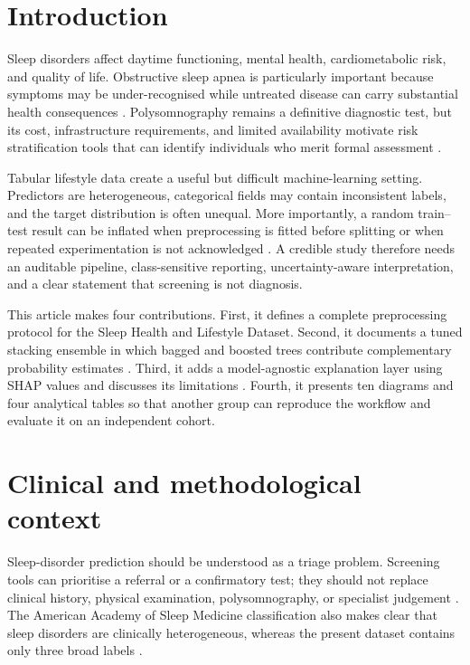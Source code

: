 ﻿\documentclass[preprint,12pt]{elsarticle}
\begin{document}
\section{Introduction}
Sleep disorders affect daytime functioning, mental health, cardiometabolic risk, and quality of life. Obstructive sleep apnea is particularly important because symptoms may be under-recognised while untreated disease can carry substantial health consequences \cite{aasm2021,icd2023,sleepai2022}. Polysomnography remains a definitive diagnostic test, but its cost, infrastructure requirements, and limited availability motivate risk stratification tools that can identify individuals who merit formal assessment \cite{aasm2021,sleepai2022}.

Tabular lifestyle data create a useful but difficult machine-learning setting. Predictors are heterogeneous, categorical fields may contain inconsistent labels, and the target distribution is often unequal. More importantly, a random train--test result can be inflated when preprocessing is fitted before splitting or when repeated experimentation is not acknowledged \cite{riley2021,kapoor2023}. A credible study therefore needs an auditable pipeline, class-sensitive reporting, uncertainty-aware interpretation, and a clear statement that screening is not diagnosis.

This article makes four contributions. First, it defines a complete preprocessing protocol for the Sleep Health and Lifestyle Dataset. Second, it documents a tuned stacking ensemble in which bagged and boosted trees contribute complementary probability estimates \cite{tabular2022,xgbreview2021,stackreview2022}. Third, it adds a model-agnostic explanation layer using SHAP values and discusses its limitations \cite{arrieta2020,lundberg2020}. Fourth, it presents ten diagrams and four analytical tables so that another group can reproduce the workflow and evaluate it on an independent cohort.

\section{Clinical and methodological context}
Sleep-disorder prediction should be understood as a triage problem. Screening tools can prioritise a referral or a confirmatory test; they should not replace clinical history, physical examination, polysomnography, or specialist judgement \cite{icd2023,aasm2021}. The American Academy of Sleep Medicine classification also makes clear that sleep disorders are clinically heterogeneous, whereas the present dataset contains only three broad labels \cite{icd2023}.
\end{document}
